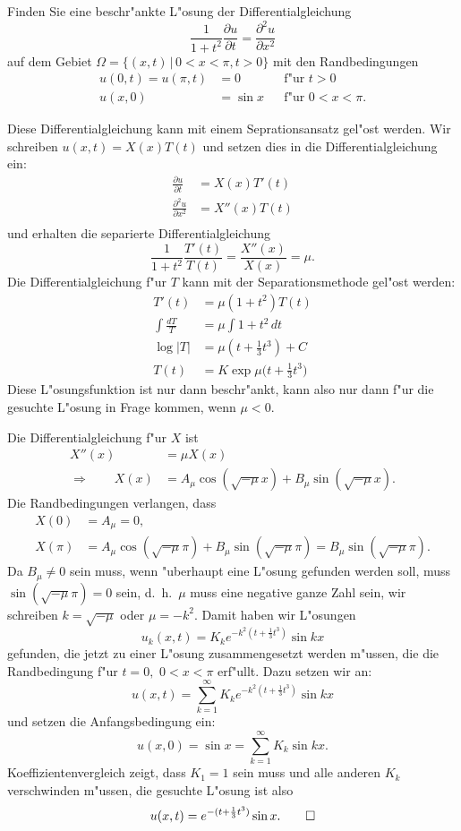 Finden Sie eine beschr"ankte L"osung der Differentialgleichung
\begin{equation}
\frac1{1+t^2}\frac{\partial u}{\partial t}=\frac{\partial^2 u}{\partial x^2}
\label{40000010:dgl}
\end{equation}
auf dem Gebiet $\Omega=\{(x,t)\,|\, 0<x<\pi,t>0\}$ 
mit den Randbedingungen
\begin{align*}
u(0,t)=u(\pi,t)&=0&&\text{f"ur $t > 0$}\\
u(x,0)&=\sin x&&\text{f"ur $0<x<\pi$}.
\end{align*}

\begin{loesung}
Diese Differentialgleichung kann mit einem Seprationsansatz gel"ost werden.
Wir schreiben $u(x,t)=X(x)T(t)$ und setzen dies in die Differentialgleichung
ein:
\begin{align*}
\frac{\partial u}{\partial t}&=X(x)T'(t)\\
\frac{\partial^2 u}{\partial x^2}&=X''(x)T(t)\\
\end{align*}
und erhalten die separierte Differentialgleichung
\[
\frac1{1+t^2}\frac{T'(t)}{T(t)}=\frac{X''(x)}{X(x)}=\mu.
\]
Die Differentialgleichung f"ur $T$ kann mit der Separationsmethode
gel"ost werden:
\begin{align*}
T'(t)&=\mu (1+t^2)T(t)\\
\int\frac{dT}{T}&=\mu\int 1+t^2\,dt\\
\log|T|&=\mu(t+\frac13t^3) +C\\
T(t)&=K\exp\mu\biggl(t+\frac13t^3\biggr)
\end{align*}
Diese L"osungsfunktion ist nur dann beschr"ankt, kann also nur dann
f"ur die gesuchte L"osung in Frage kommen, wenn $\mu <0$.

Die Differentialgleichung f"ur $X$ ist
\begin{align*}
X''(x)&=\mu X(x)\\
\Rightarrow\qquad
X(x)&=A_\mu \cos(\sqrt{-\mu}x) + B_\mu\sin(\sqrt{-\mu}x).
\end{align*}
Die Randbedingungen verlangen, dass
\begin{align*}
X(0)&=A_\mu=0,\\
X(\pi)&=A_\mu\cos(\sqrt{-\mu}\pi)+B_\mu\sin(\sqrt{-\mu}\pi)=B_\mu\sin(\sqrt{-\mu}\pi).
\end{align*}
Da $B_\mu\ne 0$ sein muss, wenn "uberhaupt eine L"osung gefunden werden
soll, muss $\sin(\sqrt{-\mu}\pi)=0$ sein, d.~h.~$\mu$ muss eine negative ganze
Zahl sein, wir schreiben $k=\sqrt{-\mu}$ oder $\mu=-k^2$.
Damit haben wir L"osungen
\[
u_k(x,t)=K_k e^{-k^2(t+\frac13t^3)}\sin kx
\]
gefunden, die jetzt zu einer L"osung zusammengesetzt werden m"ussen, die
die Randbedingung f"ur $t=0,$ $0<x<\pi$ erf"ullt. Dazu setzen wir an:
\[
u(x,t)=\sum_{k=1}^\infty K_k e^{-k^2(t+\frac13t^3)}\sin kx
\]
und setzen die Anfangsbedingung ein:
\[
u(x,0)=\sin x=\sum_{k=1}^\infty K_k \sin kx.
\]
Koeffizientenvergleich zeigt, dass $K_1=1$ sein muss und alle anderen $K_k$
verschwinden m"ussen, die gesuchte L"osung ist also
\[
u(x,t)=e^{-(t+\frac13t^3)}\sin x.
\qedhere
\]
\end{loesung}

